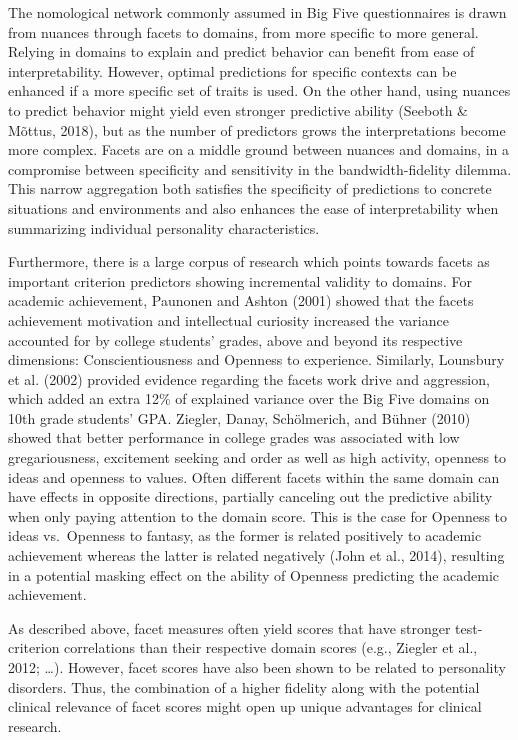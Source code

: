 \documentclass[man]{apa6}
\theoremstyle{definition}
\theoremstyle{definition}
\theoremstyle{definition}
\theoremstyle{remark}
\begin{document}
The nomological network commonly assumed in Big Five questionnaires is
drawn from nuances through facets to domains, from more specific to more
general. Relying in domains to explain and predict behavior can benefit
from ease of interpretability. However, optimal predictions for specific
contexts can be enhanced if a more specific set of traits is used. On
the other hand, using nuances to predict behavior might yield even
stronger predictive ability (Seeboth \& Mõttus, 2018), but as the number
of predictors grows the interpretations become more complex. Facets are
on a middle ground between nuances and domains, in a compromise between
specificity and sensitivity in the bandwidth-fidelity dilemma. This
narrow aggregation both satisfies the specificity of predictions to
concrete situations and environments and also enhances the ease of
interpretability when summarizing individual personality
characteristics.

Furthermore, there is a large corpus of research which points towards
facets as important criterion predictors showing incremental validity to
domains. For academic achievement, Paunonen and Ashton (2001) showed
that the facets achievement motivation and intellectual curiosity
increased the variance accounted for by college students' grades, above
and beyond its respective dimensions: Conscientiousness and Openness to
experience. Similarly, Lounsbury et al. (2002) provided evidence
regarding the facets work drive and aggression, which added an extra
12\% of explained variance over the Big Five domains on 10th grade
students' GPA. Ziegler, Danay, Schölmerich, and Bühner (2010) showed
that better performance in college grades was associated with low
gregariousness, excitement seeking and order as well as high activity,
openness to ideas and openness to values. Often different facets within
the same domain can have effects in opposite directions, partially
canceling out the predictive ability when only paying attention to the
domain score. This is the case for Openness to ideas vs.~Openness to
fantasy, as the former is related positively to academic achievement
whereas the latter is related negatively (John et al., 2014), resulting
in a potential masking effect on the ability of Openness predicting the
academic achievement.

As described above, facet measures often yield scores that have stronger
test-criterion correlations than their respective domain scores (e.g.,
Ziegler et al., 2012; \ldots{}). However, facet scores have also been
shown to be related to personality disorders. Thus, the combination of a
higher fidelity along with the potential clinical relevance of facet
scores might open up unique advantages for clinical research.
\end{document}
